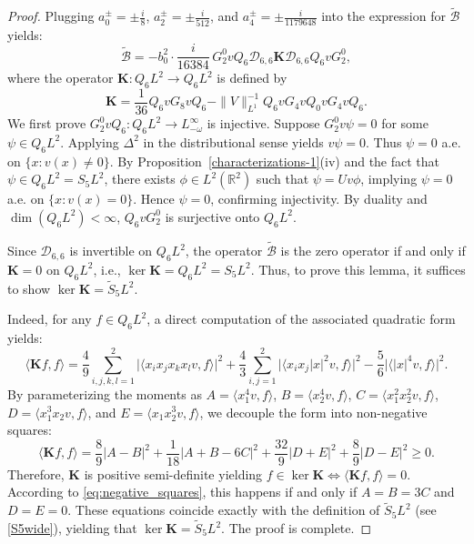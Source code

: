\documentclass[reqno]{amsart}
\numberwithin{equation}{section}
\begin{document}
\begin{proof}  
	Plugging  $a_0^\pm = \pm \frac{i}{8}$, $a_2^\pm = \pm \frac{i}{512}$, and $a_4^\pm = \pm \frac{i}{1179648}$ into the expression for $\widetilde{\mathcal{B}}$ yields:  
	\[  
	\widetilde{\mathcal{B}} = -b_0^2 \cdot \frac{i}{16384} \, G_2^0 v Q_6\mathcal{D}_{6,6} \mathbf{K} \mathcal{D}_{6,6} Q_6v G_2^0,  
	\]  
	where the operator $\mathbf{K} \colon Q_6 L^2 \to Q_6 L^2$ is defined by  
	\[  
	\mathbf{K} = \frac{1}{36}Q_6 v G_8 v Q_6 -  \|V\|_{L^1}^{-1} Q_6 v G_4 v Q_0 v G_4 v Q_6.  
	\]  
	We first prove $G_2^0 v Q_6 \colon Q_6 L^2 \to L^\infty_{-\omega}$ is injective. Suppose $G_2^0 v \psi = 0$ for some $\psi \in Q_6 L^2$. Applying $\Delta^2$ in the distributional sense yields $v \psi = 0$. Thus \(\psi=0\) a.e. on $\{x:v(x)\neq0\}.$
    By Proposition~\ref{characterizations-1}(iv) and the fact that $\psi \in Q_6 L^2 = S_5 L^2$, there exists $\phi \in L^2(\mathbb{R}^2)$ such that $\psi = U v \phi$, implying  \(\psi=0\) a.e.  on \(\{x: v(x)=0\}\). Hence $\psi  = 0$, confirming injectivity. By duality and $\dim(Q_6 L^2)< \infty$, $Q_6 v G_2^0$ is surjective onto $Q_6 L^2$. 

	Since $\mathcal{D}_{6,6}$ is invertible on $Q_6 L^2$, the operator $\widetilde{\mathcal{B}}$ is the zero operator if and only if $\mathbf{K} = 0$ on $Q_6 L^2$, i.e., $\ker\mathbf{K} = Q_6L^2 = S_5L^2$. Thus, to prove this lemma, it suffices to show $\ker\mathbf{K}=\widetilde{S}_5L^2$.  
	
Indeed,	for any $f \in Q_6 L^2$, a direct computation of the associated quadratic form yields:  
	\[  
	\langle \mathbf{K} f, f \rangle =  \frac{4}{9}  \sum_{i,j,k,l=1}^2 \bigl| \langle x_i x_j x_k x_l v, f \rangle \bigr|^2 + \frac{4}{3}  \sum_{i,j=1}^2 \bigl| \langle x_i x_j |x|^2 v, f \rangle \bigr|^2 - \frac{5}{6}  \bigl| \langle |x|^4 v, f \rangle \bigr|^2.  
	\]  
	By parameterizing the moments as $A = \langle x_1^4 v, f \rangle$, $B = \langle x_2^4 v, f \rangle$, $C = \langle x_1^2 x_2^2 v, f \rangle$, $D = \langle x_1^3 x_2 v, f \rangle$, and $E = \langle x_1 x_2^3 v, f \rangle$, we decouple the form into non-negative squares:  
	\begin{equation}\label{eq:negative_squares}  
		\langle \mathbf{K} f, f \rangle =  \frac{8}{9} |A-B|^2 + \frac{1}{18} |A+B-6C|^2 + \frac{32}{9} |D+E|^2 + \frac{8}{9} |D-E|^2\geq0.  
	\end{equation}  
	Therefore, $\mathbf{K}$ is positive semi-definite yielding $f \in \ker \mathbf{K} \iff \langle \mathbf{K}f, f \rangle = 0$. According to \eqref{eq:negative_squares}, this happens if and only if $A = B = 3C$ and $D = E = 0$. These equations coincide exactly with the definition of $\widetilde{S}_5L^2$ (see \eqref{S5wide}), yielding that $\ker\mathbf{K} = \widetilde{S}_5L^2$. The proof is complete.  
\end{proof}  
\end{document}
